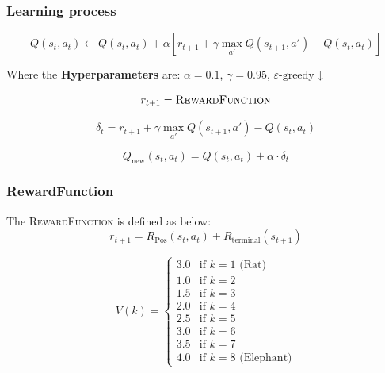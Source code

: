 \documentclass{article}
\begin{document}
\subsubsection{Learning process}
$$ Q(s_t, a_t) \leftarrow Q(s_t, a_t) + \alpha \left[ r_{t+1} + \gamma \max_{a'} Q(s_{t+1}, a') - Q(s_t, a_t) \right] $$



Where the \textbf{Hyperparameters} are: $\alpha = 0.1$, $\gamma = 0.95$, $\varepsilon\text{-greedy} \downarrow$


$$ r_{t+1} = \textsc{RewardFunction} $$

$$ \delta_t = r_{t+1} + \gamma \max_{a'} Q(s_{t+1}, a') - Q(s_t, a_t) $$

$$ Q_{\text{new}}(s_t, a_t) = Q(s_t, a_t) + \alpha \cdot \delta_t $$

\subsubsection{RewardFunction} 
The \textsc{RewardFunction} is defined as below:
$$ r_{t+1} = R_{\text{Pos}}(s_t, a_t) + R_{\text{terminal}}(s_{t+1}) $$




$$ V(k) = \begin{cases}
3.0 & \text{if } k = 1 \text{ (Rat)} \\
1.0 & \text{if } k = 2 \\
1.5 & \text{if } k = 3 \\
2.0 & \text{if } k = 4 \\
2.5 & \text{if } k = 5 \\
3.0 & \text{if } k = 6 \\
3.5 & \text{if } k = 7 \\
4.0 & \text{if } k = 8 \text{ (Elephant)}
\end{cases} $$
\end{document}
